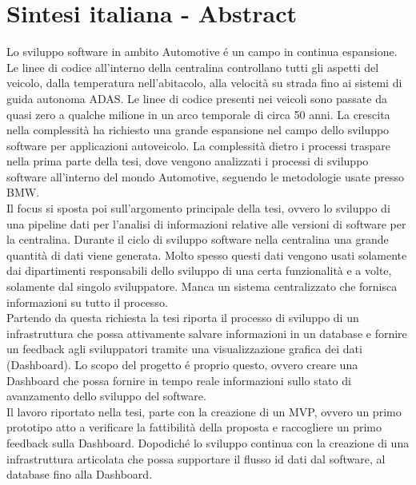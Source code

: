 \documentclass[../main.tex]{subfiles}
\begin{document}
\section{Sintesi italiana - Abstract}
Lo sviluppo software in ambito Automotive é un campo in continua espansione. Le linee di codice all'interno della centralina controllano tutti gli aspetti del veicolo, dalla temperatura nell'abitacolo, alla velocità su strada fino ai sistemi di guida autonoma ADAS. 
Le linee di codice presenti nei veicoli sono passate da quasi zero a qualche milione in un arco temporale di circa 50 anni. La crescita nella complessità ha richiesto una grande espansione nel campo dello sviluppo software per applicazioni autoveicolo. La complessità dietro i processi traspare nella prima parte della tesi, dove vengono analizzati i processi di sviluppo software all'interno del mondo Automotive, seguendo le metodologie usate presso \gls{BMW}.\\
Il focus si sposta poi sull'argomento principale della tesi, ovvero lo sviluppo di una pipeline dati per l'analisi di informazioni relative alle versioni di software per la centralina. Durante il ciclo di sviluppo software nella centralina una grande quantità di dati viene generata. Molto spesso questi dati vengono usati solamente dai dipartimenti responsabili dello sviluppo di una certa funzionalità e a volte, solamente dal singolo sviluppatore. Manca un sistema centralizzato che fornisca informazioni su tutto il processo.\\
Partendo da questa richiesta la tesi riporta il processo di sviluppo di un infrastruttura che possa attivamente salvare informazioni in un database e fornire un feedback agli sviluppatori tramite una visualizzazione grafica dei dati (Dashboard). Lo scopo del progetto é proprio questo, ovvero creare una Dashboard che possa fornire in tempo reale informazioni sullo stato di avanzamento dello sviluppo del software.\\
Il lavoro riportato nella tesi, parte con la creazione di un MVP, ovvero un primo prototipo atto a verificare la fattibilità della proposta e raccogliere un primo feedback sulla Dashboard. Dopodiché lo sviluppo continua con la creazione di una infrastruttura articolata che possa supportare il flusso id dati dal software, al database fino alla Dashboard. 
\end{document}
